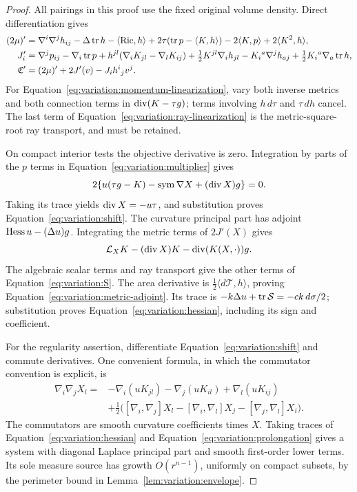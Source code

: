 \begin{proof}
All pairings in this proof use the fixed original volume density.
Direct differentiation gives
\begin{align}
 (2\mu)'={}&\nabla^i\nabla^jh_{ij}-\Delta\operatorname{tr} h-\langle\operatorname{Ric},h\rangle
    +2\tau(\operatorname{tr} p-\langle K,h\rangle)
    -2\langle K,p\rangle+2\langle K^2,h\rangle,
 \label{eq:variation:scalar-linearization}\\
 J'_i={}&\nabla^jp_{ij}-\nabla_i\operatorname{tr} p
   +h^{jl}(\nabla_iK_{jl}-\nabla_lK_{ij})
   +\tfrac12K^{jl}\nabla_i h_{jl}
   -K_i{}^a\nabla^j h_{aj}
   +\tfrac12K_i{}^a\nabla_a\operatorname{tr} h,
 \label{eq:variation:momentum-linearization}\\
 \mathfrak C'={}&(2\mu)'+2J'(v)-J_i h^i{}_jv^j.
 \label{eq:variation:ray-linearization}
\end{align}
For Equation~\eqref{eq:variation:momentum-linearization}, vary both inverse
metrics and both connection terms in $\operatorname{div}(K-\tau g)$; terms involving
$h\,d\tau$ and $\tau\,dh$ cancel.  The last term of
Equation~\eqref{eq:variation:ray-linearization} is the metric-square-root ray
transport, and must be retained.

On compact interior tests the objective derivative is zero.  Integration
by parts of the $p$ terms in Equation~\eqref{eq:variation:multiplier} gives
\[
 2\{u(\tau g-K)-\operatorname{sym}\nabla X+(\operatorname{div} X)g\}=0.
\]
Taking its trace yields $\operatorname{div} X=-u\tau$, and substitution proves
Equation~\eqref{eq:variation:shift}.  The curvature principal part has adjoint
$\operatorname{Hess} u-(\Delta u)g$.  Integrating the metric terms of $2J'(X)$ gives
\[
 \mathcal L_XK-(\operatorname{div} X)K-\operatorname{div}(K(X,\cdot))g.
\]
The algebraic scalar terms and ray transport give the other terms of
Equation~\eqref{eq:variation:S}.  The area derivative is
$\tfrac12\langle d\mathcal T,h\rangle$, proving
Equation~\eqref{eq:variation:metric-adjoint}.  Its trace is
$-k\Delta u+\operatorname{tr}\mathcal S=-ck\,d\sigma/2$;
substitution proves Equation~\eqref{eq:variation:hessian}, including its sign and
coefficient.

For the regularity assertion, differentiate
Equation~\eqref{eq:variation:shift} and commute derivatives.  One convenient
formula, in which the commutator convention is explicit, is
\begin{equation}\label{eq:variation:prolongation}
 \begin{split}
 \nabla_i\nabla_jX_l={}&-\nabla_i(uK_{jl})-\nabla_j(uK_{il})
                         +\nabla_l(uK_{ij})\\
 &+\tfrac12\big([\nabla_i,\nabla_j]X_l
       -[\nabla_i,\nabla_l]X_j-[\nabla_j,\nabla_l]X_i\big).
 \end{split}
\end{equation}
The commutators are smooth curvature coefficients times $X$.  Taking
traces of Equation~\eqref{eq:variation:hessian} and
Equation~\eqref{eq:variation:prolongation} gives a system with diagonal
Laplace principal part and smooth first-order lower terms.  Its sole
measure source has growth $O(r^{n-1})$, uniformly on compact subsets,
by the perimeter bound in Lemma~\ref{lem:variation:envelope}.


\end{proof}
